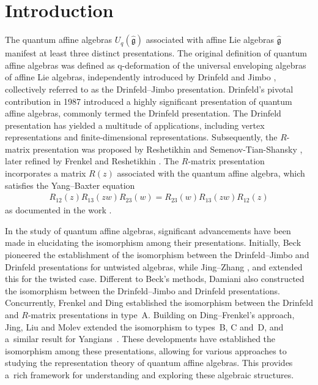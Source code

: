 \documentclass[pdftex]{sigma}
\numberwithin{equation}{section}
\begin{document}


\section{Introduction}

The quantum affine algebras $U_q(\hat{\mathfrak{g}})$ associated with affine Lie algebras $\hat{\mathfrak{g}}$ manifest at least three distinct presentations. The original definition of quantum affine algebras was defined as q-deformation of the universal enveloping algebras of affine Lie algebras, independently introduced by Drinfeld \cite{VGD} and Jimbo \cite{MJB}, collectively referred to as the Drinfeld--Jimbo presentation.
Drinfeld's pivotal contribution in 1987 \cite{VGD2} introduced a highly significant presentation of quantum affine algebras, commonly termed the Drinfeld presentation. The Drinfeld presentation has yielded a multitude of applications, including vertex representations and finite-dimensional representations. Subsequently, the $R$-matrix presentation was proposed by Reshetikhin and Semenov-Tian-Shansky \cite{RS}, later refined by Frenkel and Reshetikhin \cite{FIBR}.
The $R$-matrix presentation incorporates a matrix $R(z)$ associated with the quantum affine algebra, which satisfies the Yang--Baxter equation
\begin{gather*}
 R_{12}(z)R_{13}(zw)R_{23}(w)=R_{23}(w)R_{13}(zw)R_{12}(z)
\end{gather*}as documented in the work \cite{RS}.

In the study of quantum affine algebras, significant advancements have been made in elucidating the isomorphism among their presentations. Initially, Beck \cite{JBECK} pioneered the establishment of the isomorphism between the Drinfeld--Jimbo and Drinfeld presentations for untwisted algebras, while Jing--Zhang \cite{NJHZ1,NJHZ}, and \cite{HNJING} extended this for the twisted case. Different to Beck's methods, Damiani \cite{Damiani1,Damiani2} also constructed the isomorphism between the Drinfeld--Jimbo and Drinfeld presentations. Concurrently, Frenkel and Ding \cite{JDIB} established the isomorphism between the Drinfeld and $R$-matrix presentations in type~A. Building on Ding--Frenkel's approach, Jing, Liu and Molev \cite{JMA,JMAB} extended the {isomorphism} to types~B, C and~D, and a~similar result for Yangians~\cite{JMAB-Y}. These developments have established the isomorphism among these presentations, allowing for various approaches to studying the representation theory of quantum affine algebras. This provides a~rich framework for understanding and exploring these algebraic structures.
\end{document}
